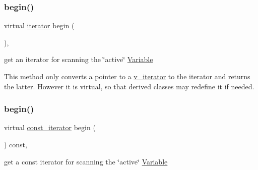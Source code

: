 \subsubsection{\texorpdfstring{begin()}{begin()}\hspace{0.1cm}{\footnotesize\ttfamily [1/2]}}
{\footnotesize\ttfamily virtual \mbox{\hyperlink{class_s_m_spp__di__unipi__it_1_1_thin_var_dep_interface_1_1iterator}{iterator}} begin (\begin{DoxyParamCaption}\item[{void}]{ }\end{DoxyParamCaption})\hspace{0.3cm}{\ttfamily [inline]}, {\ttfamily [virtual]}}



get an iterator for scanning the \char`\"{}active\char`\"{} \mbox{\hyperlink{class_s_m_spp__di__unipi__it_1_1_variable}{Variable}} 

This method only converts a pointer to a \mbox{\hyperlink{class_s_m_spp__di__unipi__it_1_1_thin_var_dep_interface_1_1v__iterator}{v\+\_\+iterator}} to the iterator and returns the latter. However it is virtual, so that derived classes may redefine it if needed. \mbox{\label{group___thin_var_dep_interface___c_l_a_s_s_e_s_ga4780b8a1692a5b1b810ace218aec9c63}} 
\subsubsection{\texorpdfstring{begin()}{begin()}\hspace{0.1cm}{\footnotesize\ttfamily [2/2]}}
{\footnotesize\ttfamily virtual \mbox{\hyperlink{class_s_m_spp__di__unipi__it_1_1_thin_var_dep_interface_1_1const__iterator}{const\+\_\+iterator}} begin (\begin{DoxyParamCaption}\item[{void}]{ }\end{DoxyParamCaption}) const\hspace{0.3cm}{\ttfamily [inline]}, {\ttfamily [virtual]}}



get a const iterator for scanning the \char`\"{}active\char`\"{} \mbox{\hyperlink{class_s_m_spp__di__unipi__it_1_1_variable}{Variable}} 

